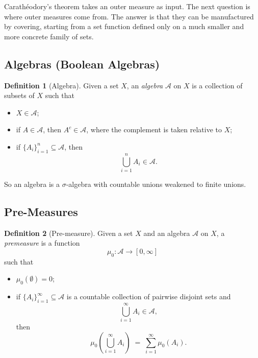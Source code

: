 \documentclass[11pt]{article}
\theoremstyle{definition}
\newtheorem{definition}{Definition}[section]
\theoremstyle{plain}
\newcommand{\A}{\mathcal{A}}
\begin{document}
Carath\'eodory's theorem takes an outer measure as input. The next
question is where outer measures come from. The answer is that they can
be manufactured by covering, starting from a set function defined only
on a much smaller and more concrete family of sets.

\subsection{Algebras (Boolean Algebras)}

\begin{definition}[Algebra]
Given a set $X$, an \emph{algebra} $\A$ on $X$ is a collection of
subsets of $X$ such that
\begin{itemize}
  \item $X \in \A$;
  \item if $A \in \A$, then $A^{c} \in \A$, where the complement is
        taken relative to $X$;
  \item if $\{A_i\}_{i=1}^{n} \subseteq \A$, then
        \[
          \bigcup_{i=1}^{n} A_i \in \A.
        \]
\end{itemize}
\end{definition}

So an algebra is a $\sigma$-algebra with countable unions weakened to
finite unions.

\subsection{Pre-Measures}

\begin{definition}[Pre-measure]
Given a set $X$ and an algebra $\A$ on $X$, a \emph{premeasure} is a
function
\[
  \mu_0 : \A \to [0,\infty]
\]
such that
\begin{itemize}
  \item $\mu_0(\emptyset) = 0$;
  \item if $\{A_i\}_{i=1}^{\infty} \subseteq \A$ is a countable
        collection of pairwise disjoint sets and
        \[
          \bigcup_{i=1}^{\infty} A_i \in \A,
        \]
        then
        \[
          \mu_0\left( \bigcup_{i=1}^{\infty} A_i \right)
            \;=\; \sum_{i=1}^{\infty} \mu_0(A_i).
        \]
\end{itemize}
\end{definition}
\end{document}
